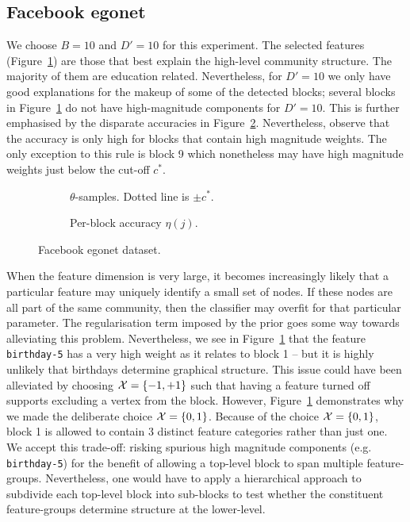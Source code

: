 \subsection{Facebook egonet}

We choose $B=10$ and $D'=10$ for this experiment. The selected features 
(Figure~\ref{fig:fb-null}) are those that best explain the high-level 
community structure. The majority of them are education related. 
Nevertheless, for $D'=10$ we only have good explanations for the makeup 
of some of the detected blocks; several blocks in 
Figure~\ref{fig:fb-null} do not have high-magnitude components for $D'=10$. This is further emphasised by the disparate accuracies in Figure~\ref{fig:fb-accuracy}. Nevertheless, observe that the accuracy is only high for blocks that contain high magnitude weights. The only exception to this rule is block 9 which nonetheless may have high magnitude weights just below the cut-off $c^*$.
%
\begin{figure}[!h]
	\centering
	\begin{subfigure}[t]{0.45\linewidth}
		\centering
		\caption{$\theta$-samples. Dotted line is $\pm c^*$.}
		\label{fig:fb-null}
	\end{subfigure}
	\begin{subfigure}[t]{0.45\linewidth}
		\centering
		\caption{Per-block accuracy $\eta(j)$.}
		\label{fig:fb-accuracy}
	\end{subfigure}
	\caption{Facebook egonet dataset.}
	\label{fig:fb}
\end{figure}

When the feature dimension is very large, it becomes increasingly likely that 
a particular feature may uniquely identify a small set of nodes. If these nodes 
are all part of the same community, then the classifier may overfit for that 
particular parameter. The regularisation term imposed by the prior goes some 
way towards alleviating this problem. Nevertheless, we see in 
Figure~\ref{fig:fb-null} that the feature \verb*|birthday-5| has a very 
high weight as it relates to block 1 -- but it is highly unlikely
that birthdays determine graphical structure. This issue could have been alleviated by 
choosing $\mathcal{X}=\{-1, +1\}$ such that having a feature turned off supports excluding 
a vertex from the block. However, Figure~\ref{fig:fb-null} demonstrates why we made 
the deliberate choice $\mathcal{X}=\{0,1\}$. 
Because of the choice $\mathcal{X}=\{0,1\}$, block 1 is allowed to contain 3 distinct feature 
categories rather than just one. We accept this trade-off: risking spurious high magnitude 
components (e.g. \verb*|birthday-5|) for the benefit of allowing a top-level block to span 
multiple feature-groups. Nevertheless, one would have to apply a hierarchical approach 
to subdivide each top-level block into sub-blocks to test whether the constituent 
feature-groups determine structure at the lower-level.